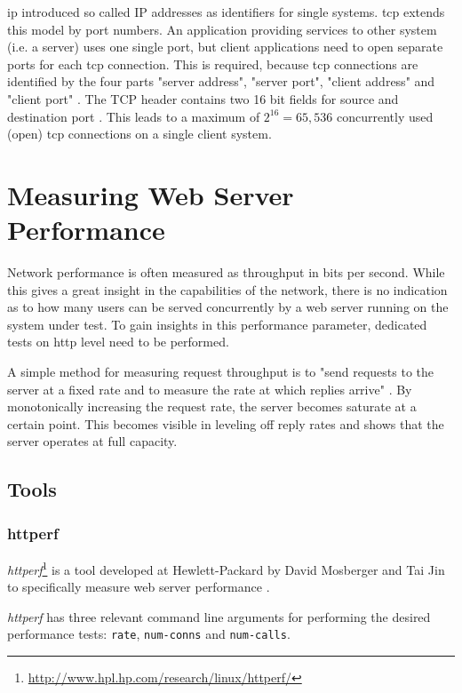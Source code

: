 \gls{ip} introduced so called IP addresses as identifiers for single systems. \gls{tcp} extends this model by port numbers. An application providing services to other system (i.e. a server) uses one single port, but client applications need to open separate ports for each \gls{tcp} connection. This is required, because \gls{tcp} connections are identified by the four parts "server address", "server port", "client address" and "client port" \cite{tcp}. The TCP header contains two 16 bit fields for source and destination port \cite{kn1}. This leads to a maximum of $2^{16} = 65,536$ concurrently used (open) \gls{tcp} connections on a single client system.

\section{Measuring Web Server Performance}

Network performance is often measured as throughput in bits per second. While this gives a great insight in the capabilities of the network, there is no indication as to how many users can be served concurrently by a web server running on the system under test. To gain insights in this performance parameter, dedicated tests on \gls{http} level need to be performed.

A simple method for measuring request throughput is to "send requests to the server at a fixed rate and to measure the rate at which replies arrive" \cite{httperf}. By monotonically increasing the request rate, the server becomes saturate  at a certain point. This becomes visible in leveling off reply rates and shows that the server operates at full capacity. \cite{httperf}

\subsection{Tools}

\subsubsection{httperf}

\textit{httperf}\footnote{\url{http://www.hpl.hp.com/research/linux/httperf/}} is a tool developed at Hewlett-Packard by David Mosberger and Tai Jin to specifically measure web server performance \cite{httperf}.

\textit{httperf} has three relevant command line arguments for performing the desired performance tests: \texttt{rate}, \texttt{num-conns} and \texttt{num-calls}.

